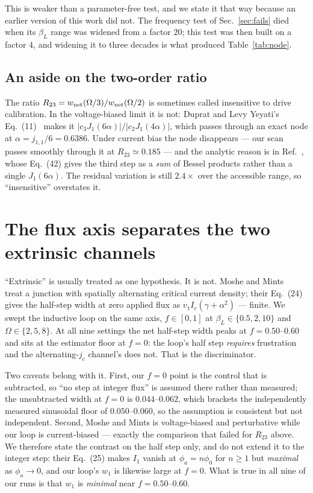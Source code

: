 \documentclass[aps,prb,twocolumn,superscriptaddress,floatfix,nofootinbib]{revtex4-2}
\begin{document}
This is weaker than a parameter-free test, and we state it that way because an
earlier version of this work did not. The frequency test of
Sec.~\ref{sec:fails} died when its $\beta_L$ range was widened from a factor
$20$; this test was then built on a factor $4$, and widening it to three decades
is what produced Table~\ref{tab:node}.

\subsection{An aside on the two-order ratio}

The ratio $R_{23}=w_{\rm net}(\Omega/3)/w_{\rm net}(\Omega/2)$ is sometimes
called insensitive to drive calibration. In the voltage-biased limit it is not:
Duprat and Levy Yeyati's Eq.~(11)~\cite{Duprat2005} makes it
$|c_3J_1(6\alpha)|/|c_2J_1(4\alpha)|$, which passes through an exact node at
$\alpha=j_{1,1}/6=0.6386$. Under current bias the node disappears --- our scan
passes smoothly through it at $R_{23}\simeq0.185$ --- and the analytic reason is
in Ref.~\cite{Tsarev2025}, whose Eq.~(42) gives the third step as a \emph{sum}
of Bessel products rather than a single $J_1(6\alpha)$. The residual variation
is still $2.4\times$ over the accessible range, so ``insensitive'' overstates it.

\section{The flux axis separates the two extrinsic channels}

``Extrinsic'' is usually treated as one hypothesis. It is not. Moshe and
Mints~\cite{Moshe2007} treat a junction with spatially alternating critical
current density; their Eq.~(24) gives the half-step width at zero applied flux
as $v_1I_c(\gamma+\alpha^2)$ --- finite. We swept the inductive loop on the same
axis, $f\in[0,1]$ at $\beta_L\in\{0.5,2,10\}$ and $\Omega\in\{2,5,8\}$. At all
nine settings the net half-step width peaks at $f=0.50$--$0.60$ and sits at the
estimator floor at $f=0$: the loop's half step \emph{requires} frustration and
the alternating-$j_c$ channel's does not. That is the discriminator.

Two caveats belong with it. First, our $f=0$ point is the control that is
subtracted, so ``no step at integer flux'' is assumed there rather than
measured; the unsubtracted width at $f=0$ is $0.044$--$0.062$, which brackets the
independently measured sinusoidal floor of $0.050$--$0.060$, so the assumption
is consistent but not independent. Second, Moshe and Mints is voltage-biased and
perturbative while our loop is current-biased --- exactly the comparison that
failed for $R_{23}$ above. We therefore state the contrast on the half step
only, and do not extend it to the integer step: their Eq.~(25) makes $I_1$
vanish at $\phi_a=n\phi_0$ for $n\ge1$ but \emph{maximal} as $\phi_a\to0$, and
our loop's $w_1$ is likewise large at $f=0$. What is true in all nine of our
runs is that $w_1$ is \emph{minimal} near $f=0.50$--$0.60$.
\end{document}
